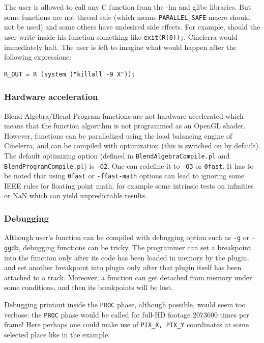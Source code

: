 The user is allowed to call any C function from the -lm and glibc libraries. But some functions are not thread safe (which means \texttt{PARALLEL\_SAFE} macro should not be used) and some others have undesired side effects. For example, should the user write inside his function something like \texttt{exit(R(0));}, Cinelerra would immediately halt. The user is left to imagine what would happen after the following expressione:

\begin{lstlisting}[style=sh]
	R_OUT = R (system ("killall -9 X"));
\end{lstlisting}

\subsubsection*{Hardware acceleration}
\label{ssub:hardware_acceleration}

Blend Algebra/Blend Program functions are not hardware accelerated which means that the function algorithm is not programmed as an OpenGL shader.  However, functions can be parallelized using the load balancing engine of Cinelerra, and can be compiled with optimization (this is switched on by default). The default optimizing option (defined in \texttt{BlendAlgebraCompile.pl} and \texttt{BlendProgramCompile.pl}) is \texttt{-O2}. One can redefine it to \texttt{-O3} or \texttt{0fast}. It has to be noted that using \texttt{0fast} or \texttt{-ffast-math} options can lead to ignoring some IEEE rules for floating point math, for example some intrinsic tests on infinities or NaN which can yield unpredictable results.

\subsubsection*{Debugging}
\label{ssub:debugging_blend}

Although user's function can be compiled with debugging option such as \texttt{-g} or \texttt{-ggdb}, debugging functions can be tricky. The programmer can set a breakpoint into the function only after its code has been loaded in memory by the plugin, and set another breakpoint into plugin only after that plugin itself has been attached to a track. Moreover, a function can get detached from memory under some conditions, and then its breakpoints will be lost.

Debugging printout inside the \texttt{PROC} phase, although possible, would seem too verbose: the \texttt{PROC} phase would be called for full-HD footage 2073600 times per frame! Here perhaps one could make use of \texttt{PIX\_X, PIX\_Y} coordinates at some selected place like in the example:

